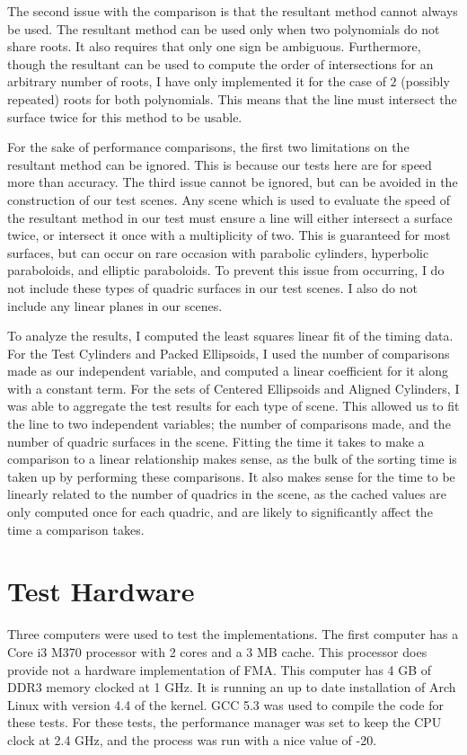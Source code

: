 \documentclass{cccg16}
\begin{document}
The second issue with the comparison is that the resultant method
cannot always be used.  The resultant method can be used only when two
polynomials do not share roots.  It also requires that only one sign
be ambiguous.  Furthermore, though the resultant can be used to
compute the order of intersections for an arbitrary number of roots,
I have only implemented it for the case of $2$ (possibly repeated)
roots for both polynomials.  This means that the line must intersect
the surface twice for this method to be usable.

For the sake of performance comparisons, the first two limitations on
the resultant method can be ignored.  This is because our tests here
are for speed more than accuracy.  The third issue cannot be ignored,
but can be avoided in the construction of our test scenes.  Any scene
which is used to evaluate the speed of the resultant method in our
test must ensure a line will either intersect a surface twice, or
intersect it once with a multiplicity of two.  This is guaranteed for
most surfaces, but can occur on rare occasion with parabolic
cylinders, hyperbolic paraboloids, and elliptic paraboloids.  To
prevent this issue from occurring, I do not include these types of
quadric surfaces in our test scenes.  I also do not include any
linear planes in our scenes.

To analyze the results, I computed the least squares linear fit of
the timing data.  For the Test Cylinders and Packed Ellipsoids, I
used the number of comparisons made as our independent variable, and
computed a linear coefficient for it along with a constant term.  For
the sets of Centered Ellipsoids and Aligned Cylinders, I was able to
aggregate the test results for each type of scene.  This allowed us to
fit the line to two independent variables; the number of comparisons
made, and the number of quadric surfaces in the scene.  Fitting the
time it takes to make a comparison to a linear relationship makes
sense, as the bulk of the sorting time is taken up by performing these
comparisons.  It also makes sense for the time to be linearly related
to the number of quadrics in the scene, as the cached values are only
computed once for each quadric, and are likely to significantly affect
the time a comparison takes.

\section{Test Hardware}
Three computers were used to test the implementations.  The first
computer has a Core i3 M370 processor with 2 cores and a 3 MB cache.
This processor does provide not a hardware implementation of FMA.
This computer has 4 GB of DDR3 memory clocked at 1 GHz.  It is running
an up to date installation of Arch Linux with version 4.4 of the
kernel.  GCC 5.3 was used to compile the code for these tests.  For
these tests, the performance manager was set to keep the CPU clock at
2.4 GHz, and the process was run with a nice value of -20.
\end{document}
